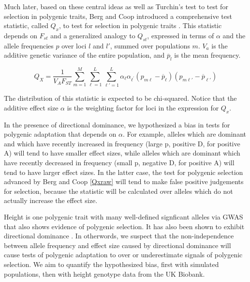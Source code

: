 \documentclass[a4paper,12pt]{article}
\begin{document}
Much later, based on these central ideas as well as Turchin's test \cite{heightselection} to test
for selection in polygenic traits, Berg and Coop introduced a comprehensive test statistic,
called $Q_x$, to test for selection in polygenic traits \cite{berg}. This statistic depends on $F_{st}$ and
a generalized analogy to $Q_{st}$, expressed in terms of $\alpha$ and
the allele frequencies $p$ over loci $l$ and $l'$, summed over
populations $m$. $V_a$ is the additive genetic variance of the entire
population, and $\overline{p}_l$ is the mean frequency.

\begin{equation} \label{Qxraw}
  Q_X = \frac{1}{V_A F_{ST}} \sum_{m=1}^M \sum_{\ell=1}^L \sum_{\ell\prime=1}^L \alpha_{\ell} \alpha_{\ell^{\prime}}\left(p_{m\ell} - \overline{p}_\ell \right)\left(p_{m \ell\prime} - \overline{p}_{\ell\prime}\right)
\end{equation}


The distribution of this statistic is expected to be chi-squared. Notice that the additive effect size $\alpha$ is the weighting factor for loci in the
expression for $Q_x$. 

In the presence of directional dominance, we hypothesized a bias in
tests for polygenic adaptation that depends on $\alpha$. For example, alleles which are dominant and which have recently increased in
frequency (large p, positive D, for positive A) will tend to have smaller effect sizes, while
alleles which are dominant which have recently decreased in frequency
(small p, negative D, for positive A) will tend to have larger effect sizes. In the
latter case, the test for polygenic selection advanced by Berg and Coop
\eqref{Qxraw} will tend to make false positive judgements for
selection, because the statistic will be calculated over alleles which
do not actually increase the effect size.

Height is one polygenic trait with many well-defined signficant
alleles via GWAS \cite{heightselection} that also shows evidence of polygenic selection. It has also been shown to exhibit
directional dominance \cite{heightdirectdom}. In otherwords, we
suspect that the non-independence between allele frequency and effect
size caused by directional dominance will cause tests of polygenic
adaptation to over or underestimate signals of polygenic selection. We aim to quantify the
hypothesized bias, first with simulated populations, then with height genotype data from the UK Biobank.
\end{document}
